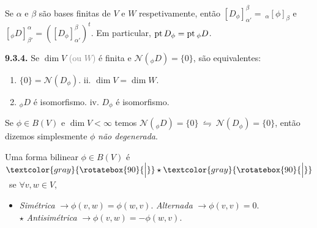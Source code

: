 \newcommand{\pt}{\operatorname{pt}}

\begin{proposition}
    \label{prop:933}
    Se \(\alpha \) e \(\beta \) são bases finitas de \(V \) e \(W\) respetivamente, então \([ D_\phi]^\beta_{\alpha'} = \ _\alpha[\phi]_\beta\) e \([_\phi D]^\alpha_{\beta'} = ([ D_\phi]^\beta_{\alpha'})^t\). Em particular, \(\pt D_\phi = \pt \hspace{0.01cm} _\phi D \). 
\end{proposition}


\begin{corollary}
    \textbf{9.3.4.} Se \(\dim V\) \textcolor{gray}{(ou \(W\))} é finita e \( \mathcal{N}(_\phi D) = \{0\}\), são equivalentes: %
    \begin{enumerate}[left = 1.8cm, label = \roman*.]
        \item \(\{0\} = \mathcal{N}(D_\phi)  \).  \hspace{4cm} ii. \(\dim V = \dim W\).  
        \item[iii.] \(_\phi D\) é isomorfismo. \hspace{3cm} iv. \(D_\phi\) é isomorfismo. 
    \end{enumerate}
\end{corollary}


\begin{note}
    Se \(\phi \in B(V)\) e \(\dim V < \infty \) temos \(\mathcal{N}(_\phi D) = \{0\} \ \leftrightharpoons\ \mathcal{N}(D_\phi) = \{0\}\), então dizemos simplesmente \(\phi\) \emph{não degenerada}. 
\end{note}

\begin{definition}
    Uma forma bilinear \(\phi \in B(V)\)  é \ \(\textcolor{gray}{\rotatebox{90}{\Big|}}\star\textcolor{gray}{\rotatebox{90}{\Big|}}\) \ se \(\forall v,w \in V\), 
    \begin{itemize}[label = \(\star\)]
        \item \emph{Simétrica} \(\rightarrow \phi(v,w) = \phi(w,v)\). \hspace{1.4cm}{ \(\star\)} \emph{Alternada} \(\rightarrow \phi(v,v) = 0\). \vspace{0.3cm}\\
        \- \hspace{3cm}\(\star\) \emph{Antisimétrica} \(\rightarrow \phi(v,w) =- \phi(w,v) \). 
    \end{itemize}
\end{definition}

